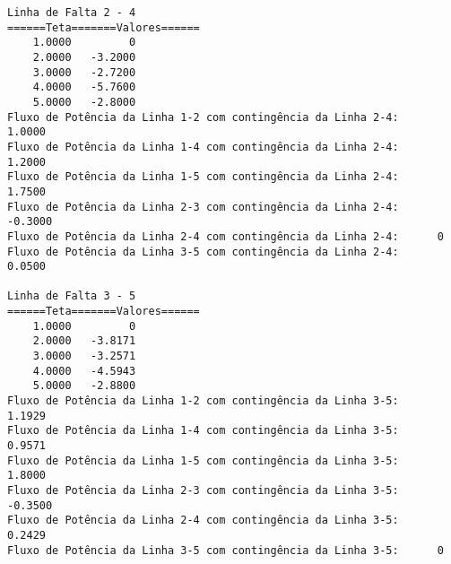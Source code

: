 \begin{verbatim}
Linha de Falta 2 - 4
======Teta=======Valores======
    1.0000         0
    2.0000   -3.2000
    3.0000   -2.7200
    4.0000   -5.7600
    5.0000   -2.8000
Fluxo de Potência da Linha 1-2 com contingência da Linha 2-4:     1.0000
Fluxo de Potência da Linha 1-4 com contingência da Linha 2-4:     1.2000
Fluxo de Potência da Linha 1-5 com contingência da Linha 2-4:     1.7500
Fluxo de Potência da Linha 2-3 com contingência da Linha 2-4:    -0.3000
Fluxo de Potência da Linha 2-4 com contingência da Linha 2-4:      0
Fluxo de Potência da Linha 3-5 com contingência da Linha 2-4:     0.0500

Linha de Falta 3 - 5
======Teta=======Valores======
    1.0000         0
    2.0000   -3.8171
    3.0000   -3.2571
    4.0000   -4.5943
    5.0000   -2.8800
Fluxo de Potência da Linha 1-2 com contingência da Linha 3-5:     1.1929
Fluxo de Potência da Linha 1-4 com contingência da Linha 3-5:     0.9571
Fluxo de Potência da Linha 1-5 com contingência da Linha 3-5:     1.8000
Fluxo de Potência da Linha 2-3 com contingência da Linha 3-5:    -0.3500
Fluxo de Potência da Linha 2-4 com contingência da Linha 3-5:     0.2429
Fluxo de Potência da Linha 3-5 com contingência da Linha 3-5:      0
\end{verbatim}
